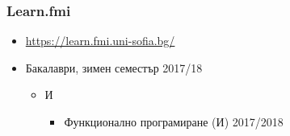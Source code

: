\documentclass{beamer}
\begin{document}
\begin{frame}
  \frametitle{Learn.fmi}
  
  \begin{itemize}
  \item \url{https://learn.fmi.uni-sofia.bg/}
  \item Бакалаври, зимен семестър 2017/18
    \begin{itemize}
    \item И
      \begin{itemize}
      \item Функционално програмиране (И) 2017/2018
      \end{itemize}
    \end{itemize}
  \end{itemize}
\end{frame}
\end{document}
